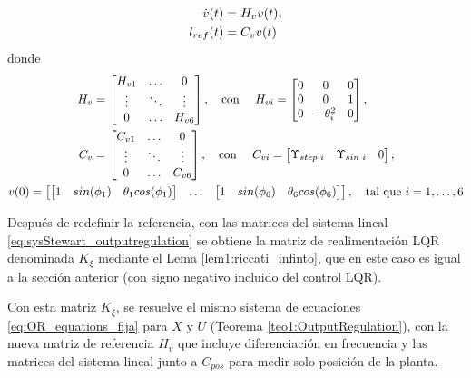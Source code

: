 \begin{align}
\label{eq:sys_ref_variable}
    \dot{v}(t) & = H_v v(t), \notag \\
    l_{ref}(t) & = C_v v(t)
\end{align}
donde 
\begin{gather}
    \begin{align}
    H_v & = \begin{bmatrix}
        H_{v1} & \hdots & 0 \\
        \vdots & \ddots & \vdots \\ 
        0 & \hdots & H_{v6}
    \end{bmatrix}, 
    \quad \textrm{con } \quad
    H_{vi} = \begin{bmatrix}
        0 & 0 & 0 \\
        0 & 0 & 1 \\
        0 & -\theta_i^2 & 0
    \end{bmatrix}, \notag \\
    C_v & = \begin{bmatrix}
        C_{v1} & \hdots & 0 \\
        \vdots & \ddots & \vdots \\ 
        0 & \hdots & C_{v6}
    \end{bmatrix},
    \quad \textrm{con } \quad
    C_{vi} = \begin{bmatrix}
        \Upsilon_{step\textrm{ }i} & \Upsilon_{sin\textrm{ }i} & 0
    \end{bmatrix}, 
    \end{align} \\
    v(0) = \begin{bmatrix}
        \begin{bmatrix} 1 & sin(\phi_1) & \theta_1 cos(\phi_1) \end{bmatrix} & \hdots & \begin{bmatrix} 1 & sin(\phi_6) & \theta_6 cos(\phi_6) \end{bmatrix} 
    \end{bmatrix}, \quad
    \textrm{tal que } i = 1,\hdots,6 \notag
\end{gather}

Después de redefinir la referencia, con las matrices del sistema lineal \ref{eq:sysStewart_outputregulation} se obtiene la matriz de realimentación LQR denominada $K_\xi$ mediante el Lema \ref{lem1:riccati_infinto}, que en este caso es igual a la sección anterior (con signo negativo incluido del control LQR).

Con esta matriz $K_\xi$, se resuelve el mismo sistema de ecuaciones \ref{eq:OR_equations_fija} para $X$ y $U$ (Teorema \ref{teo1:OutputRegulation}), con la nueva matriz de referencia $H_v$ que incluye diferenciación en frecuencia y las matrices del sistema lineal junto a $C_{pos}$ para medir solo posición de la planta. 

